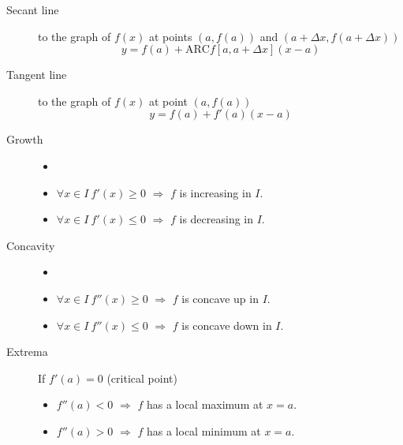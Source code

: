 \begin{multicols}{2}
	\begin{tcolorbox}[hbox, title=Secant and tangent lines]
		\begin{minipage}{0.4\textwidth}
			\flushleft
			\begin{description}
				\item[Secant line] to the graph of $f(x)$ at points $(a,f(a))$ and $(a+\Delta x, f(a+\Delta x))$
				      \[
					      y=f(a)+\mbox{ARC}f[a,a+\Delta x](x-a)
				      \]
				\item[Tangent line] to the graph of $f(x)$ at point $(a,f(a))$
				      \[
					      y=f(a)+f'(a)(x-a)
				      \]
			\end{description}
		\end{minipage}
	\end{tcolorbox}

	\begin{tcolorbox}[hbox, title={Growth, concavity and extrema}]
		\begin{minipage}{0.4\textwidth}
			\flushleft
			\begin{description}
				\item[Growth]
				      \begin{itemize}
					      \item[]
					      \item $\forall x\in I\ f'(x)\geq 0$ $\Rightarrow$ $f$ is increasing in $I$.
					      \item $\forall x\in I\ f'(x)\leq 0$ $\Rightarrow$ $f$ is decreasing in $I$.
				      \end{itemize}
				\item[Concavity]
				      \begin{itemize}
					      \item[]
					      \item $\forall x\in I\ f''(x)\geq 0$ $\Rightarrow$ $f$ is concave up in $I$.
					      \item $\forall x\in I\ f''(x)\leq 0$ $\Rightarrow$ $f$ is concave down in $I$.
				      \end{itemize}
				\item[Extrema] If $f'(a)=0$ (critical point)
				      \begin{itemize}
					      \item $f''(a)<0$ $\Rightarrow$ $f$ has a local maximum at $x=a$.
					      \item $f''(a)>0$ $\Rightarrow$ $f$ has a local minimum at $x=a$.
				      \end{itemize}
			\end{description}
		\end{minipage}
	\end{tcolorbox}


\end{multicols}
